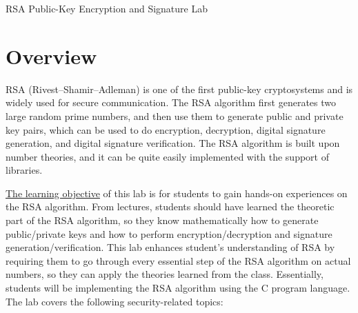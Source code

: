 







\begin{center}
{\LARGE RSA Public-Key Encryption and Signature Lab}
\end{center}




\section{Overview}

RSA (Rivest–Shamir–Adleman) is one of the first public-key cryptosystems
and is widely used for secure communication. 
The RSA algorithm first generates two large random prime numbers, 
and then use them to generate public and private key pairs, which can be
used to do encryption, decryption, digital signature generation, 
and digital signature verification. The RSA algorithm is built upon 
number theories, and it can be quite easily implemented with the support of
libraries. 


\underline{The learning objective} of this lab is for students to gain hands-on experiences on
the RSA algorithm. From lectures, students should have learned the 
theoretic part of the RSA algorithm, so they know 
mathematically how to generate public/private keys and 
how to perform encryption/decryption and signature generation/verification. 
This lab enhances student's understanding of RSA 
by requiring them to go through every essential step of the RSA algorithm
on actual numbers, so they can apply the theories learned from the class. 
Essentially, students will be implementing the RSA algorithm using 
the C program language. The lab covers the following security-related topics:

